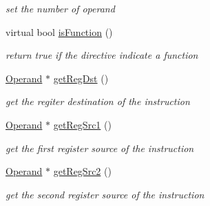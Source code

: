 \begin{DoxyCompactItemize}
\begin{DoxyCompactList}\small\item\em set the number of operand \item\end{DoxyCompactList}\item 
\hypertarget{classInstruction_ac7d969cbfe439058d54a78f924e46b8e}{
virtual bool \hyperlink{classInstruction_ac7d969cbfe439058d54a78f924e46b8e}{isFunction} ()}
\label{classInstruction_ac7d969cbfe439058d54a78f924e46b8e}

\begin{DoxyCompactList}\small\item\em return true if the directive indicate a function \item\end{DoxyCompactList}\item 
\hypertarget{classInstruction_ab479411998d84d1fab040fe9d09e3ea3}{
\hyperlink{classOperand}{Operand} $\ast$ \hyperlink{classInstruction_ab479411998d84d1fab040fe9d09e3ea3}{getRegDst} ()}
\label{classInstruction_ab479411998d84d1fab040fe9d09e3ea3}

\begin{DoxyCompactList}\small\item\em get the regiter destination of the instruction \item\end{DoxyCompactList}\item 
\hypertarget{classInstruction_a71763d6a2b2a1d64b3115ca78bce736b}{
\hyperlink{classOperand}{Operand} $\ast$ \hyperlink{classInstruction_a71763d6a2b2a1d64b3115ca78bce736b}{getRegSrc1} ()}
\label{classInstruction_a71763d6a2b2a1d64b3115ca78bce736b}

\begin{DoxyCompactList}\small\item\em get the first register source of the instruction \item\end{DoxyCompactList}\item 
\hypertarget{classInstruction_ae896b626e81e6213db9c23147b50d960}{
\hyperlink{classOperand}{Operand} $\ast$ \hyperlink{classInstruction_ae896b626e81e6213db9c23147b50d960}{getRegSrc2} ()}
\label{classInstruction_ae896b626e81e6213db9c23147b50d960}

\begin{DoxyCompactList}\small\item\em get the second register source of the instruction \item\end{DoxyCompactList}\end{DoxyCompactItemize}


